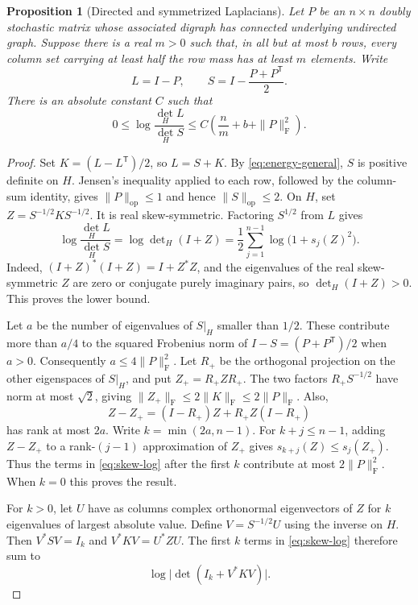 \documentclass[11pt]{article}
\newcommand{\op}{\mathrm{op}}
\newcommand{\Frob}{\mathrm{F}}
\newcommand{\trans}{\mathsf{T}}
\newtheorem{proposition}[theorem]{Proposition}
\begin{document}
\begin{proposition}[Directed and symmetrized Laplacians]\label{prop:comparison}
Let \(P\) be an \(n\times n\) doubly stochastic matrix whose associated digraph has connected underlying undirected graph. Suppose there is a real \(m>0\) such that, in all but at most \(b\) rows, every column set carrying at least half the row mass has at least \(m\) elements. Write
\[
 L=I-P,\qquad S=I-\frac{P+P^{\trans}}{2}.
\]
There is an absolute constant \(C\) such that
\begin{equation}\label{eq:comparison}
 0\le \log\frac{\det_H L}{\det_H S}
 \le C\left(\frac{n}{m}+b+\|P\|_{\Frob}^2\right).
\end{equation}
\end{proposition}

\begin{proof}
Set \(K=(L-L^{\trans})/2\), so \(L=S+K\). By \eqref{eq:energy-general}, \(S\) is positive definite on \(H\). Jensen's inequality applied to each row, followed by the column-sum identity, gives \(\|P\|_{\op}\le 1\) and hence \(\|S\|_{\op}\le 2\). On \(H\), set \(Z=S^{-1/2}KS^{-1/2}\). It is real skew-symmetric. Factoring \(S^{1/2}\) from \(L\) gives
\begin{equation}\label{eq:skew-log}
 \log\frac{\det_H L}{\det_H S}
 =\log\det\nolimits_H(I+Z)
 =\frac12\sum_{j=1}^{n-1}\log\bigl(1+s_j(Z)^2\bigr).
\end{equation}
Indeed, \((I+Z)^*(I+Z)=I+Z^*Z\), and the eigenvalues of the real skew-symmetric \(Z\) are zero or conjugate purely imaginary pairs, so \(\det_H(I+Z)>0\). This proves the lower bound.

Let \(a\) be the number of eigenvalues of \(S|_H\) smaller than \(1/2\). These contribute more than \(a/4\) to the squared Frobenius norm of \(I-S=(P+P^{\trans})/2\) when \(a>0\). Consequently \(a\le4\|P\|_{\Frob}^2\). Let \(R_+\) be the orthogonal projection on the other eigenspaces of \(S|_H\), and put \(Z_+=R_+ Z R_+\). The two factors \(R_+S^{-1/2}\) have norm at most \(\sqrt{2}\), giving \(\|Z_+\|_{\Frob}\le2\|K\|_{\Frob}\le2\|P\|_{\Frob}\). Also,
\[
 Z-Z_+=(I-R_+)Z+R_+Z(I-R_+)
\]
has rank at most \(2a\). Write \(k=\min(2a,n-1)\). For \(k+j\le n-1\), adding \(Z-Z_+\) to a rank-\((j-1)\) approximation of \(Z_+\) gives \(s_{k+j}(Z)\le s_j(Z_+)\). Thus the terms in \eqref{eq:skew-log} after the first \(k\) contribute at most \(2\|P\|_{\Frob}^2\). When \(k=0\) this proves the result.

For \(k>0\), let \(U\) have as columns complex orthonormal eigenvectors of \(Z\) for \(k\) eigenvalues of largest absolute value. Define \(V=S^{-1/2}U\) using the inverse on \(H\). Then \(V^*SV=I_k\) and \(V^*KV=U^*ZU\). The first \(k\) terms in \eqref{eq:skew-log} therefore sum to
\begin{equation}\label{eq:top-modes}
 \log\bigl|\det(I_k+V^*KV)\bigr|.
\end{equation}


\end{proof}
\end{document}
